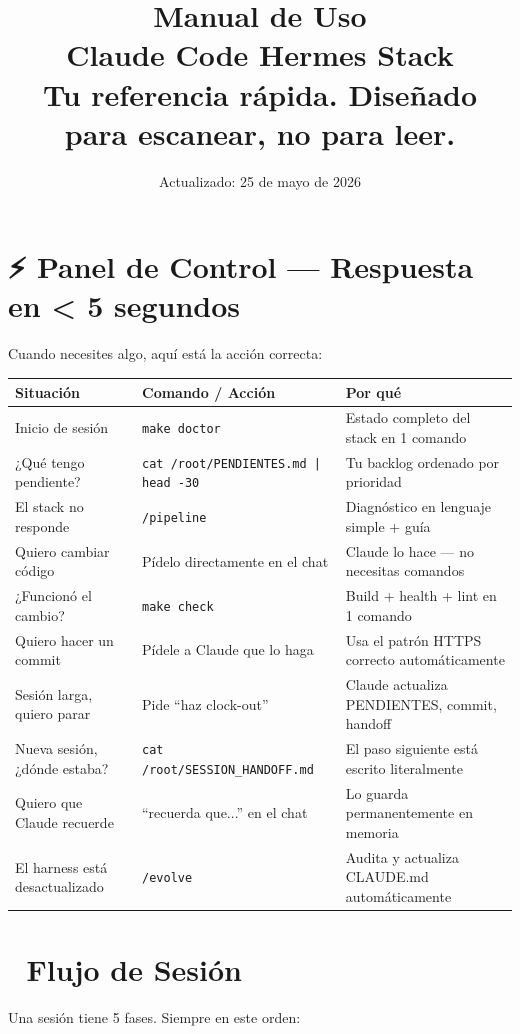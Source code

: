 \documentclass[11pt,a4paper,spanish]{article}
\title{\huge\textbf{Manual de Uso}\\[\smallskip]\Large Claude Code \textbullet{} Hermes Stack\\[\smallskip]\normalsize Tu referencia rápida. Diseñado para escanear, no para leer.}
\author{}
\date{\small Actualizado: 25 de mayo de 2026}
\begin{document}
\maketitle

\section*{⚡ Panel de Control — Respuesta en < 5 segundos}

Cuando necesites algo, aquí está la acción correcta:

\vspace{0.3cm}

\noindent\begin{tabular}{|p{2.5cm}|p{3.5cm}|p{3.5cm}|}
\hline
\textbf{Situación} & \textbf{Comando / Acción} & \textbf{Por qué} \\
\hline
Inicio de sesión & \texttt{make doctor} & Estado completo del stack en 1 comando \\
¿Qué tengo pendiente? & \texttt{cat /root/PENDIENTES.md | head -30} & Tu backlog ordenado por prioridad \\
El stack no responde & \texttt{/pipeline} & Diagnóstico en lenguaje simple + guía \\
Quiero cambiar código & Pídelo directamente en el chat & Claude lo hace — no necesitas comandos \\
¿Funcionó el cambio? & \texttt{make check} & Build + health + lint en 1 comando \\
Quiero hacer un commit & Pídele a Claude que lo haga & Usa el patrón HTTPS correcto automáticamente \\
Sesión larga, quiero parar & Pide ``haz clock-out'' & Claude actualiza PENDIENTES, commit, handoff \\
Nueva sesión, ¿dónde estaba? & \texttt{cat /root/SESSION\_HANDOFF.md} & El paso siguiente está escrito literalmente \\
Quiero que Claude recuerde & ``recuerda que...'' en el chat & Lo guarda permanentemente en memoria \\
El harness está desactualizado & \texttt{/evolve} & Audita y actualiza CLAUDE.md automáticamente \\
\hline
\end{tabular}

\section*{🔄 Flujo de Sesión}

Una sesión tiene 5 fases. Siempre en este orden:
\end{document}

